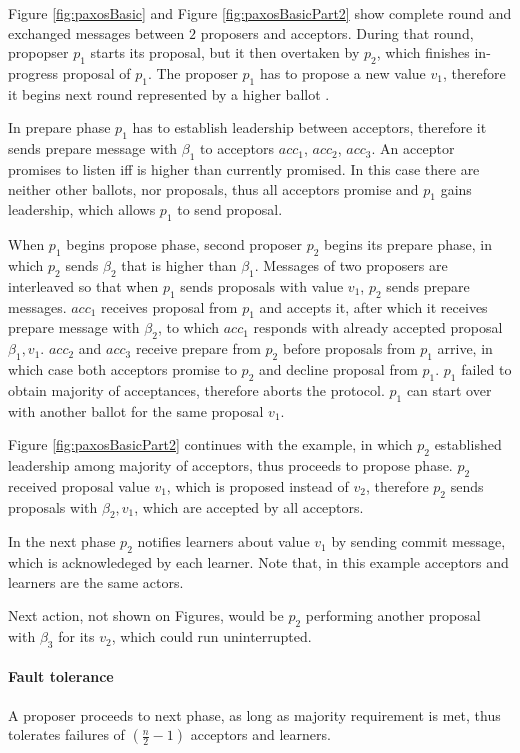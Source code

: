 Figure \ref{fig:paxosBasic} and Figure \ref{fig:paxosBasicPart2} show complete \paxos round and exchanged messages between $2$ proposers and acceptors.
During that round, propopser $p_1$ starts its proposal, but it then overtaken by $p_2$, which finishes in-progress proposal of $p_1$.
 The proposer $p_1$ has to propose a new value $v_1$, therefore it begins next \paxos round represented by a higher ballot \ballot.

In prepare phase $p_1$ has to establish leadership between acceptors, therefore it sends prepare message with $\beta_1$ to acceptors $acc_1$, $acc_2$, $acc_3$. An acceptor promises to listen iff \ballot is higher than currently promised. In this case there are neither other ballots, nor proposals, thus all acceptors promise and $p_1$ gains leadership, which allows $p_1$ to send proposal.

When $p_1$ begins propose phase, second proposer $p_2$ begins its prepare phase, in which $p_2$ sends $\beta_2$ that is higher than $\beta_1$. Messages of two proposers are interleaved so that when $p_1$ sends proposals with value $v_1$, $p_2$ sends prepare messages. $acc_1$ receives proposal from $p_1$ and accepts it, after which it receives prepare message with $\beta_2$, to which $acc_1$ responds with already accepted proposal $\beta_1,v_1$.
$acc_2$ and $acc_3$ receive prepare from $p_2$ before proposals from $p_1$ arrive, in which case both acceptors promise to $p_2$ and decline proposal from $p_1$. $p_1$ failed to obtain majority of acceptances, therefore aborts the protocol. $p_1$ can start over with another ballot for the same proposal $v_1$. 

Figure \ref{fig:paxosBasicPart2} continues with the example, in which
 $p_2$ established leadership among majority of acceptors, thus proceeds to propose phase. $p_2$ received proposal value $v_1$, which is proposed instead of $v_2$, therefore $p_2$ sends proposals with $\beta_2,v_1$, which are accepted by all acceptors.

 In the next phase $p_2$ notifies learners about value $v_1$ by sending commit message, which is acknowledeged by each learner. Note that, in this example acceptors and learners are the same actors.

 Next action, not shown on Figures, would be $p_2$ performing another proposal with $\beta_3$ for its $v_2$, which could run uninterrupted. 

 \paragraph{Fault tolerance} A proposer proceeds to next phase, as long as majority requirement is met, thus \paxos tolerates failures of 
 $(\frac{n}{2}-1)$ acceptors and learners.

